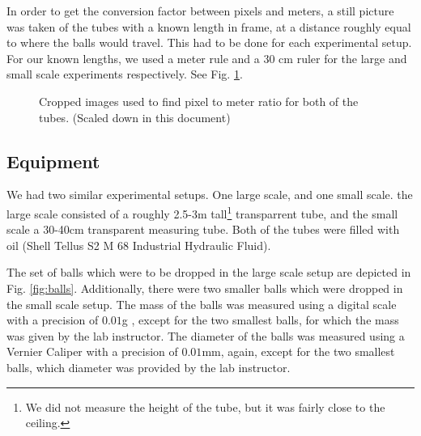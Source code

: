 \documentclass[11pt,a4paper]{article}
\begin{document}
    In order to get the conversion factor between pixels and meters, a still picture was taken of the tubes with a known length in frame, at a distance roughly equal to where the balls would travel. This had to be done for each experimental setup. For our known lengths, we used a meter rule and a $30$ cm ruler for the large and small scale experiments respectively. See Fig. \ref{fig:scale1}.

    \begin{figure}[H]
      \center
      \caption{Cropped images used to find pixel to meter ratio for both of the tubes. (Scaled down in this document)}
      \label{fig:scale1}
    \end{figure}
  
  \subsection{Equipment}

    We had two similar experimental setups. One large scale, and one small scale. the large scale consisted of a roughly 2.5-3m tall\footnote{We did not measure the height of the tube, but it was fairly close to the ceiling.} transparrent tube, and the small scale a 30-40cm transparent measuring tube. Both of the tubes were filled with oil (Shell Tellus S2 M 68 Industrial Hydraulic Fluid\cite{_shell_????}).

    The set of balls which were to be dropped in the large scale setup are depicted in Fig. \ref{fig:balls}. Additionally, there were two smaller balls which were dropped in the small scale setup. The mass of the balls was measured using a digital scale with a precision of $0.01$g \cite{_proscale_????}, except for the two smallest balls, for which the mass was given by the lab instructor. The diameter of the balls was measured using a Vernier Caliper with a precision of $0.01$mm, again, except for the two smallest balls, which diameter was provided by the lab instructor.
\end{document}
